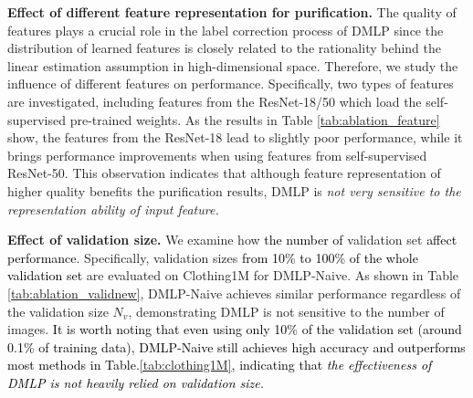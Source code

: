 \documentclass[10pt,twocolumn,letterpaper]{article}
\newcommand{\zbs}[1]{\textcolor{black}{#1}}
\begin{document}
\begin{table}[!t]
\small
    \caption{
        Investigation of the validation set size $\tau$ on Clothing1M.} 
    \vspace{-1em}
    \centering 
    \label{tab:ablation_validnew} 
    \vspace{-4mm}
\end{table} 














\textbf{Effect of different feature {representation for purification.}} The quality of features plays a crucial role in the label correction process of DMLP since {the distribution of learned features} is closely related to {the rationality behind the linear estimation assumption in high-dimensional space}. Therefore, we study the influence of different features on performance. Specifically, two types of features are investigated, including features from the ResNet-18/50 which load the self-supervised pre-trained weights. As the results in Table \ref{tab:ablation_feature} show, the features from the ResNet-18 lead to slightly poor performance, {while} it brings performance improvements when using features from self-supervised ResNet-50. {This observation indicates that although feature representation of higher quality benefits the purification results, DMLP is \emph{not very sensitive to the representation ability of input feature.}} 













 \textbf{{Effect of validation size}.} We examine how \zbs{the number of} validation set \zbs{affect performance}. Specifically, {validation} sizes \zbs{from 10\% to 100\% of the whole validation set} are evaluated on Clothing1M {for DMLP-Naive}. As shown in Table \ref{tab:ablation_validnew}, 
DMLP-Naive achieves similar performance regardless of the validation size $N_v$,
demonstrating DMLP is not sensitive to the number of images. \zbs{It is worth noting that even using only 10\% of the validation set (around 0.1\% of training data), DMLP-Naive still achieves high accuracy and outperforms most methods in Table.\ref{tab:clothing1M}, indicating that \emph{the effectiveness of DMLP is not heavily relied on validation size.}}
\end{document}
